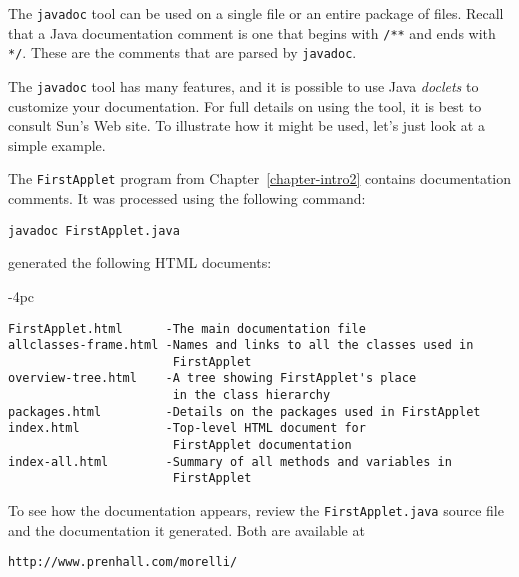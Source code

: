 The {\tt javadoc} tool can be used on a single file or an entire package
of files.  Recall that a Java documentation comment is one that begins
with \verb|/**| and ends with \verb|*/|.  These are the comments that
are parsed by {\tt javadoc}.

The {\tt javadoc} tool has many features, and it is possible to use
Java {\it doclets} to customize your documentation.  For full details
on using the tool, it is best to consult Sun's Web site.  To illustrate
how it might be used, let's just look at a simple example.

The {\tt FirstApplet} program from Chapter~\ref{chapter-intro2}
contains documentation comments.  It was processed using the
following command:

\begin{jjjlisting}
\begin{lstlisting}
javadoc FirstApplet.java
\end{lstlisting}
\end{jjjlisting}

 generated the following HTML documents:

\begin{jjjlistingleft}[30pc]{-4pc}
\begin{lstlisting}[stringstyle=\color{black}]
FirstApplet.html      -The main documentation file
allclasses-frame.html -Names and links to all the classes used in 
                       FirstApplet
overview-tree.html    -A tree showing FirstApplet's place 
                       in the class hierarchy
packages.html         -Details on the packages used in FirstApplet
index.html            -Top-level HTML document for 
                       FirstApplet documentation
index-all.html        -Summary of all methods and variables in
                       FirstApplet
\end{lstlisting}
\end{jjjlistingleft}

\noindent To see how the documentation appears, review the {\tt FirstApplet.java}
source file and the documentation it generated.  Both are available at

\begin{jjjlisting}
\begin{lstlisting}[commentstyle=\color{black}]
http://www.prenhall.com/morelli/
\end{lstlisting}
\end{jjjlisting}



%
